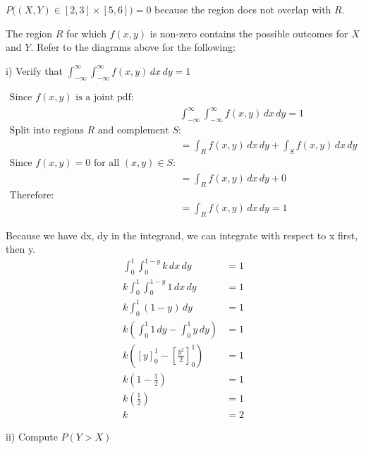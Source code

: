 \documentclass{article}
\begin{document}
        $P\big((X,Y) \in [2,3] \times [5,6]\big) = 0$ because the region does not overlap with $R$.

        The region $R$ for which $f(x,y)$ is non-zero contains the possible outcomes for $X$ and $Y$.
        \pagebreak
        Refer to the diagrams above for the following:
        
        i) Verify that $\int_{-\infty}^\infty \int_{-\infty}^\infty f(x,y) \, dx \, dy = 1$
        
        \begin{align*}
            \text{Since $f(x,y)$ is a joint pdf:} \\
            &\int_{-\infty}^\infty \int_{-\infty}^\infty f(x,y) \, dx \, dy = 1 \\[1em]
            \text{Split into regions $R$ and complement $S$:} \\
            &= \int_R f(x,y) \, dx \, dy + \int_S f(x,y) \, dx \, dy \\[1em]
            \text{Since $f(x,y) = 0$ for all $(x,y) \in S$:} \\
            &= \int_R f(x,y) \, dx \, dy + 0 \\[1em]
            \text{Therefore:} \\
            &= \int_R f(x,y) \, dx \, dy = 1
        \end{align*}

        Because we have dx, dy in the integrand, we can integrate with respect to x first, then y.
       \begin{align*}
           \int_{0}^{1} \int_{0}^{1-y} k \, dx \, dy &= 1 \\
           k \int_{0}^{1} \int_{0}^{1-y} 1 \, dx \, dy &= 1 \\
           k \int_{0}^{1} (1-y) \, dy &= 1 \\
           k \left(\int_{0}^{1} 1 \, dy - \int_{0}^{1} y \, dy\right) &= 1 \\
           k \left(\left[ y \right]_{0}^{1} - \left[ \frac{y^2}{2} \right]_{0}^{1}\right) &= 1 \\
           k \left(1 - \frac{1}{2}\right) &= 1 \\
           k \left(\frac{1}{2}\right) &= 1 \\
           k &= 2
       \end{align*}

       \pagebreak

       ii) Compute $P(Y > X)$
\end{document}
